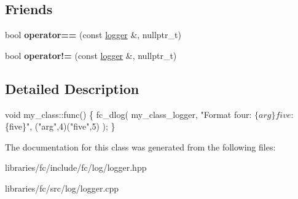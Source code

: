 \subsection*{Friends}
\begin{DoxyCompactItemize}
\item 
\mbox{\label{classfc_1_1logger_ab2ee0eaa8aeb8e0da7fa6147fc615e58}} 
bool {\bfseries operator==} (const \mbox{\hyperlink{classfc_1_1logger}{logger}} \&, nullptr\+\_\+t)
\item 
\mbox{\label{classfc_1_1logger_a293b30207b513148f76f97b13af387ac}} 
bool {\bfseries operator!=} (const \mbox{\hyperlink{classfc_1_1logger}{logger}} \&, nullptr\+\_\+t)
\end{DoxyCompactItemize}


\subsection{Detailed Description}

\begin{DoxyCode}
\textcolor{keywordtype}{void} my\_class::func() 
\{
   fc\_dlog( my\_class\_logger, \textcolor{stringliteral}{"Format four: $\{arg\}  five: $\{five\}"}, (\textcolor{stringliteral}{"arg"},4)(\textcolor{stringliteral}{"five"},5) );
\}
\end{DoxyCode}
 

The documentation for this class was generated from the following files\+:\begin{DoxyCompactItemize}
\item 
libraries/fc/include/fc/log/logger.\+hpp\item 
libraries/fc/src/log/logger.\+cpp\end{DoxyCompactItemize}
